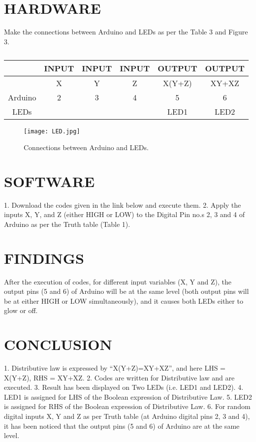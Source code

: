 \documentclass[conference]{IEEEtran}
\begin{document}
\section{HARDWARE}
Make the connections between Arduino and LEDs as per the Table 3 and Figure 3.
\begin{table}
\begin{tabular}{|c | c | c | c | c | c |} \hline
 & \textbf{INPUT} & \textbf{INPUT} & \textbf{INPUT} & \textbf{OUTPUT} & \textbf{OUTPUT} \\\hline
 & X & Y & Z & X(Y+Z) & XY+XZ \\ \hline
Arduino & 2 & 3 & 4 & 5 & 6 \\ 
LEDs &  &  &  & LED1 & LED2 \\ \hline
\end{tabular}
\caption{\label{tab:widgets}}
\end{table}

\begin{figure}[h]
\centering
\texttt{[image: LED.jpg]}
\caption{\label{fig:LED}Connections between Arduino and LEDs.}
\end{figure}
\section{SOFTWARE}
1. Download the codes given in the link below and execute them.
2. Apply the inputs X, Y, and Z (either HIGH or LOW) to the Digital Pin no.s 2, 3 and 4 of Arduino as per the Truth table (Table 1).
\section{FINDINGS}
After the execution of codes, for different input variables (X, Y and Z), the output pins (5 and 6) of Arduino will be at the same level (both output pins will be at either HIGH or LOW simultaneously), and it causes both LEDs either to glow or off.
\section{CONCLUSION}
1. Distributive law is expressed by “X(Y+Z)=XY+XZ”, and here LHS = X(Y+Z), RHS = XY+XZ.
2. Codes are written for Distributive law and are executed. 
3. Result has been displayed on Two LEDs (i.e. LED1 and LED2). 
4. LED1 is assigned for LHS of the Boolean expression of Distributive Law.
5. LED2 is assigned for RHS of the Boolean expression of Distributive Law.
6. For random digital inputs X, Y and Z as per Truth table (at Arduino digital pins 2, 3 and 4), it has been noticed that the output pins (5 and 6) of Arduino are at the same level.
\end{document}
